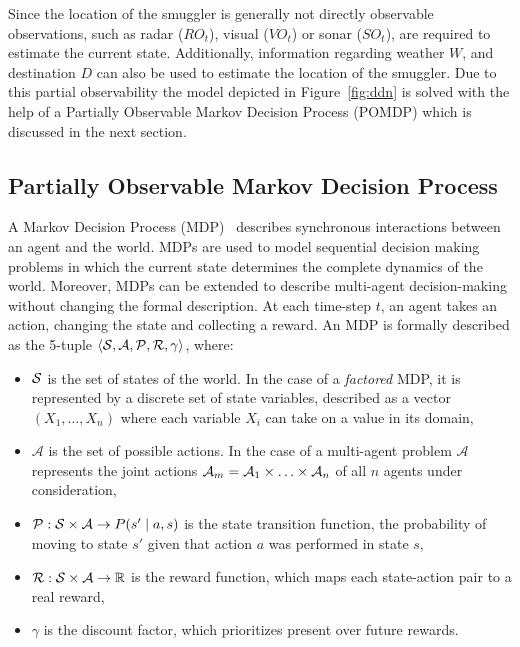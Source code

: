 \documentclass[conference]{IEEEtran}
\begin{document}
Since the location of the smuggler is generally not directly observable observations, such as radar ($RO_t$), visual ($VO_t$) or sonar ($SO_t$), are required to estimate the current state. Additionally, information regarding weather $W$, and destination $D$ can also be used to estimate the location of the smuggler. Due to this partial observability the model depicted in Figure~\ref{fig:ddn} is solved with the help of a Partially Observable Markov Decision Process (POMDP) which is discussed in the next section.


\subsection{Partially Observable Markov Decision Process}
\label{sub:pomdp}

A Markov Decision Process (MDP)~\cite{bellman1957dynamic,mdp} describes synchronous interactions between an agent and the world. MDPs are used to model sequential decision making problems in which the current state determines the complete dynamics of the world. Moreover, MDPs can be extended to describe multi-agent decision-making without changing the formal description. At each time-step $t$, an agent takes an action, changing the state and collecting a reward. An MDP is formally described as the 5-tuple $\langle\S,\mathcal{A},\P,\R,\gamma\rangle$, where:

\begin{itemize}
\item $\S$ is the set of states of the world. In the case of a \emph{factored} MDP, it is represented by a discrete set of state variables, described as a vector $\left(X_1,\ldots,X_n\right)$ where each variable $X_i$ can take on a value in its domain,
\item $\mathcal{A}$ is the set of possible actions. In the case of a multi-agent problem $\mathcal{A}$ represents the joint actions $\A_{m} = \A_1\times\ldots\times\A_n$ of all $n$ agents under consideration,
\item $\P:\S\times\mathcal{A}\to P(s^\prime\mid a,s)$ is the state transition function, \ie the probability of moving to state $s'$ given that action $a$ was performed in state $s$,
\item $\R:\S\times\mathcal{A}\to\mathbb{R}$ is the reward function, which maps each state-action pair to a real reward,
\item $\gamma$ is the discount factor, which prioritizes present over future rewards.
\end{itemize}
\end{document}

